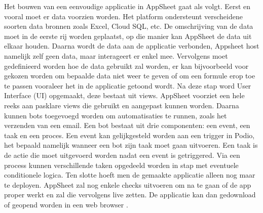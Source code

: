 Het bouwen van een eenvoudige applicatie in AppSheet gaat als volgt. Eerst en vooral moet er data voorzien worden. Het platform ondersteunt verscheidene soorten data bronnen zoals Excel, Cloud SQL, etc. De omschrijving van de data moet in de eerste rij worden geplaatst, op die manier kan AppSheet de data uit elkaar houden. Daarna wordt de data aan de applicatie verbonden, Appsheet host namelijk zelf geen data, maar interageert er enkel mee. Vervolgens moet gedefinieerd worden hoe de data gebruikt zal worden, er kan bijvoorbeeld voor gekozen worden om bepaalde data niet weer te geven of om een formule erop toe te passen vooraleer het in de applicatie getoond wordt. Na deze stap word User Interface (UI) opgemaakt, deze bestaat uit views. AppSheet voorziet een hele reeks aan pasklare views die gebruikt en aangepast kunnen worden. Daarna kunnen bots toegevoegd worden om automatisaties te runnen, zoals het verzenden van een email. Een bot bestaat uit drie componenten: een event, een taak en een proces. Een event kan gelijkgesteld worden aan een trigger in Podio, het bepaald namelijk wanneer een bot zijn taak moet gaan uitvoeren. Een taak is de actie die moet uitgevoerd worden nadat een event is getriggered. Via een process kunnen verschillende taken opgedeeld worden in stap met eventuele conditionele logica. Ten slotte hoeft men de gemaakte applicatie alleen nog maar te deployen. AppSheet zal nog enkele checks uitvoeren om na te gaan of de app proper werkt en zal die vervolgens live zetten. De applicatie kan dan gedownload of geopend worden in een web browser \autocite{AppSheetHowToCreate}. \\
